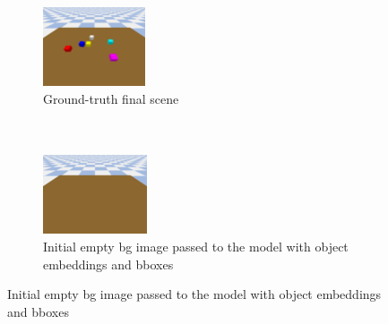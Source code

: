 \begin{figure}
    \hfill
    \begin{subfigure}{0.24\textwidth}
        \centering
        \includegraphics[width=\textwidth]{assets/recons-gt.png}
        \caption{Ground-truth final scene\\ \\ \\}
    \end{subfigure}
    \hfill
    \begin{subfigure}{0.24\textwidth}
        \centering
        \includegraphics[width=\textwidth]{assets/recons-init.png}
        \caption{Initial empty bg image passed to the model with object embeddings and bboxes}
    \end{subfigure}

\end{figure}
